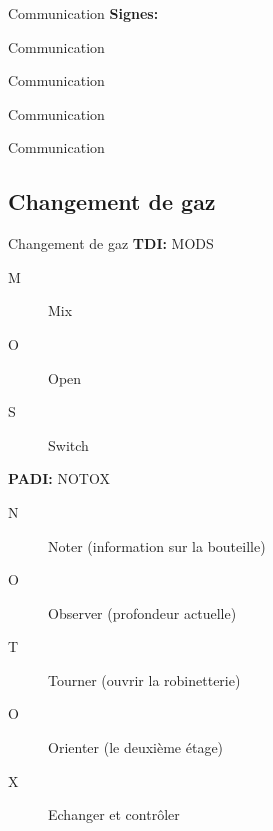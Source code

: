 \begin{frame}{Communication}  
	\textbf{Signes:}
	\vfill
\end{frame}

\begin{frame}{Communication}
	\\
\end{frame}

\begin{frame}{Communication}
	\\
\end{frame}

\begin{frame}{Communication}
\end{frame}

\begin{frame}{Communication}
	\\
\end{frame}

\subsection{Changement de gaz}

\begin{frame}{Changement de gaz}
	\textbf{TDI:} MODS
	\begin{description}
		\item[M]Mix
		\item[O]Open
		\item[S]Switch
	\end{description}
	\textbf{PADI:} NOTOX
	\begin{description}
		\item[N]Noter (information sur la bouteille)
		\item[O]Observer (profondeur actuelle)
		\item[T]Tourner (ouvrir la robinetterie)
		\item[O]Orienter (le deuxième étage)
		\item[X]Echanger et contrôler
	\end{description}
\end{frame}











